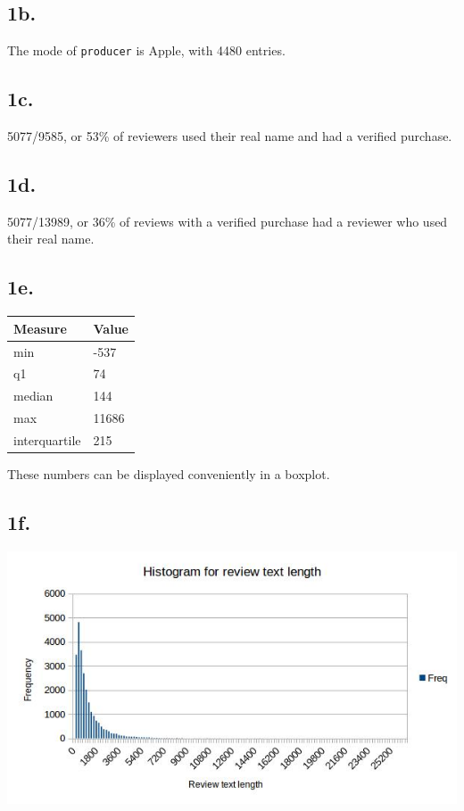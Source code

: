\documentclass{article}
\begin{document}
\subsection{1b.}
The mode of \texttt{producer} is Apple, with 4480 entries.

\subsection{1c.}
5077/9585, or 53\% of reviewers used their real name and had a verified purchase.

\subsection{1d.}
5077/13989, or 36\% of reviews with a verified purchase had a reviewer who used their real name.

\subsection{1e.}
\begin{table}[h]
\begin{center}
\begin{tabular}{|l|l|}
\hline
\textbf{Measure} & \textbf{Value} \\ \hline
min              & -537           \\ \hline
q1               & 74             \\ \hline
median           & 144            \\ \hline
max              & 11686          \\ \hline
interquartile    & 215            \\ \hline
\end{tabular}
\end{center}
\end{table}
These numbers can be displayed conveniently in a boxplot.

\subsection{1f.} 
\begin{center}
\includegraphics[keepaspectratio, scale=0.5]{histogram2.jpg}
\end{center}
\end{document}
